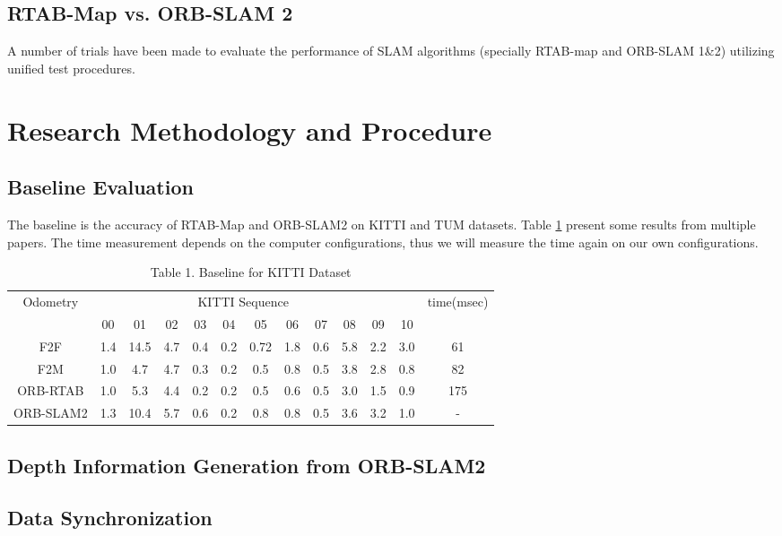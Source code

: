 \documentclass[12pt]{article}
\begin{document}
\subsection{RTAB-Map vs. ORB-SLAM 2}
A number of trials have been made to evaluate the performance of SLAM algorithms (specially RTAB-map and ORB-SLAM 1\&2)  utilizing unified test procedures. 

\section{Research Methodology and Procedure}
\subsection{Baseline Evaluation}
The baseline is the accuracy of RTAB-Map and ORB-SLAM2 on KITTI and TUM datasets. Table \ref{tab:my-table} present some results from multiple papers. The time measurement depends on the computer configurations, thus we will measure the time again on our own configurations. 
\begin{table}[]
    \centering
    \begin{tabular}{@{}ccccccccccccc@{}}
    \toprule
    Odometry  & \multicolumn{10}{c}{KITTI Sequence}                         &     & time(msec)   \\
              & 00  & 01   & 02  & 03  & 04  & 05   & 06  & 07  & 08  & 09  & 10  &     \\ \midrule
    F2F       & 1.4 & 14.5 & 4.7 & 0.4 & 0.2 & 0.72 & 1.8 & 0.6 & 5.8 & 2.2 & 3.0 & 61  \\ \midrule
    F2M       & 1.0 & 4.7  & 4.7 & 0.3 & 0.2 & 0.5  & 0.8 & 0.5 & 3.8 & 2.8 & 0.8 & 82  \\ \midrule
    ORB-RTAB  & 1.0 & 5.3  & 4.4 & 0.2 & 0.2 & 0.5  & 0.6 & 0.5 & 3.0 & 1.5 & 0.9 & 175 \\ \midrule
    ORB-SLAM2 & 1.3 & 10.4 & 5.7 & 0.6 & 0.2 & 0.8  & 0.8 & 0.5 & 3.6 & 3.2 & 1.0 & -   \\ \bottomrule
    \end{tabular}
    \caption{Table 1. Baseline for KITTI Dataset}
    \label{tab:my-table}
    \end{table}

\subsection{Depth Information Generation from ORB-SLAM2}

\subsection{Data Synchronization}
\end{document}
